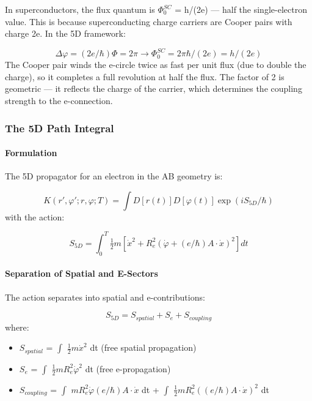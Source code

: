 \documentclass[aps,prd,preprint,superscriptaddress,longbibliography,floatfix]{revtex4-2}
\theoremstyle{remark}
\begin{document}
In superconductors, the flux quantum is $\Phi_{0}^{SC}$ = h/(2e) --- half the single-electron value. This is because superconducting charge carriers are Cooper pairs with charge 2e. In the 5D framework:


\begin{equation}
    \Delta\varphi = (2e/\hbar)\Phi = 2\pi    \to    \Phi_{0}^{SC} = 2\pi\hbar/(2e) = h/(2e)
\end{equation}
The Cooper pair winds the e-circle twice as fast per unit flux (due to double the charge), so it completes a full revolution at half the flux. The factor of 2 is geometric --- it reflects the charge of the carrier, which determines the coupling strength to the e-connection.


\subsubsection{The 5D Path Integral}


\paragraph{Formulation}

The 5D propagator for an electron in the AB geometry is:


\begin{equation}
    K(r', \varphi'; r, \varphi; T) = \int D[r(t)] D[\varphi(t)] \exp(iS_{5D}/\hbar)
\end{equation}
with the action:


\begin{equation}
    S_{5D} = \int_{0}^{T} \tfrac{1}{2}m[\dot{x}^{2} + R_e^{2}(\dot{\varphi} + (e/\hbar)A \cdot \dot{x})^{2}] dt
\end{equation}

\paragraph{Separation of Spatial and E-Sectors}

The action separates into spatial and e-contributions:


\begin{equation}
    S_{5D} = S_{spatial} + S_e + S_{coupling}
\end{equation}
where:

\begin{itemize}
  \item $S_{spatial}$ = $\int$ $\tfrac{1}{2}m\dot{x}^{2}$ dt (free spatial propagation)
  \item $S_e$ = $\int$ $\tfrac{1}{2}mR_e^{2}\dot{\varphi}^{2}$ dt (free e-propagation)
  \item $S_{coupling}$ = $\int$ $mR_e^{2}\dot{\varphi}(e/\hbar)A\cdot\dot{x}$ dt + $\int$ $\tfrac{1}{2}mR_e^{2}((e/\hbar)A\cdot\dot{x})^{2}$ dt
\end{itemize}
\end{document}
